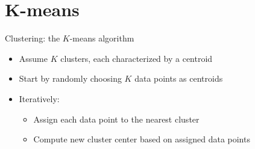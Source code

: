 \documentclass[compress,t]{beamer}
\begin{document}
\section{K-means}

\begin{frame}{Clustering: the $K$-means algorithm}
  \begin{itemize}
    \item Assume $K$ \alert{clusters}, each characterized by a \alert{centroid}
    \item Start by randomly choosing $K$ data points as centroids
    \item Iteratively:
      \begin{itemize}
      \item \alert{Assign} each data point to the \alert{nearest} cluster
      \item \alert{Compute} new cluster center based on assigned data points
      \end{itemize}
  \end{itemize}
  \begin{center}

\end{center}
\end{frame}
\end{document}

